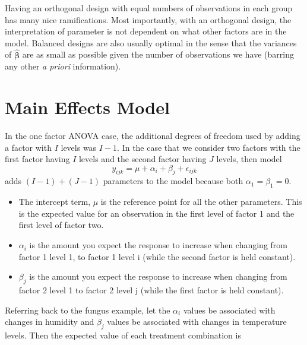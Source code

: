\documentclass[]{book}
\theoremstyle{definition}
\theoremstyle{definition}
\theoremstyle{remark}
\begin{document}
Having an orthogonal design with equal numbers of observations in each
group has many nice ramifications. Most importantly, with an orthogonal
design, the interpretation of parameter is not dependent on what other
factors are in the model. Balanced designs are also usually optimal in
the sense that the variances of \(\hat{\boldsymbol{\beta}}\) are as
small as possible given the number of observations we have (barring any
other \emph{a priori} information).

\section{Main Effects Model}\label{main-effects-model}

In the one factor ANOVA case, the additional degrees of freedom used by
adding a factor with \(I\) levels was \(I-1\). In the case that we
consider two factors with the first factor having \(I\) levels and the
second factor having \(J\) levels, then model
\[y_{ijk}=\mu+\alpha_{i}+\beta_{j}+\epsilon_{ijk}\] adds \((I-1)+(J-1)\)
parameters to the model because both \(\alpha_{1}=\beta_{1}=0\).

\begin{itemize}
\item
  The intercept term, \(\mu\) is the reference point for all the other
  parameters. This is the expected value for an observation in the first
  level of factor 1 and the first level of factor two.
\item
  \(\alpha_{i}\) is the amount you expect the response to increase when
  changing from factor 1 level 1, to factor 1 level i (while the second
  factor is held constant).
\item
  \(\beta_{j}\) is the amount you expect the response to increase when
  changing from factor 2 level 1 to factor 2 level j (while the first
  factor is held constant).
\end{itemize}

Referring back to the fungus example, let the \(\alpha_{i}\) values be
associated with changes in humidity and \(\beta_{j}\) values be
associated with changes in temperature levels. Then the expected value
of each treatment combination is
\end{document}
